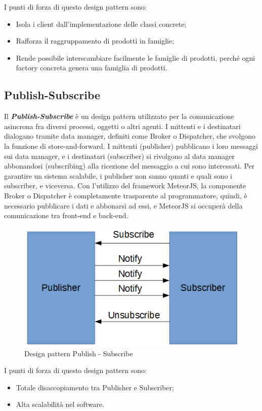 I punti di forza di questo design pattern sono:
\begin{itemize}
	\item Isola i client dall’implementazione delle classi concrete;
	\item Rafforza il raggruppamento di prodotti in famiglie;
	\item Rende possibile interscambiare facilmente le famiglie di prodotti, perché ogni factory concreta genera una famiglia di prodotti.
\end{itemize}


\subsection{Publish-Subscribe}
Il \textbf{\textit{Publish-Subscribe}} è un design pattern utilizzato per la comunicazione asincrona fra diversi processi, oggetti o altri agenti. I mittenti e i destinatari dialogano tramite data manager, definiti come Broker o Dispatcher, che svolgono la funzione di store-and-forward.
I mittenti (publisher) pubblicano i loro messaggi sui data manager, e i destinatari (subscriber) si rivolgono al data manager abbonandosi (subscribing) alla ricezione del messaggio a cui sono interessati. Per garantire un sistema scalabile, i publisher non sanno quanti e quali sono i subscriber, e viceversa. 
Con l'utilizzo del framework MeteorJS, la componente Broker o Dispatcher è completamente trasparente al programmatore, quindi, è necessario pubblicare i dati e abbonarsi ad essi, e MeteorJS si occuperà della comunicazione tra front-end e back-end.
\begin{figure}[H]
	\centering
	\includegraphics[width=0.5\linewidth]{IMG/pubsub}
	\caption{Design pattern Publish - Subscribe}
\end{figure}

I punti di forza di questo design pattern sono:
\begin{itemize}
	\item Totale disaccopiamento tra Publisher e Subscriber;
	\item Alta scalabilità nel software.
\end{itemize}


